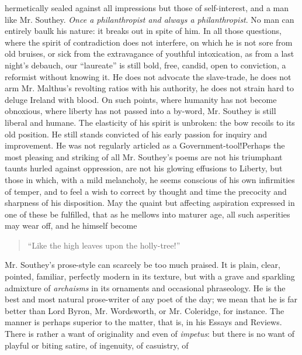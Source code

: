 hermetically sealed against all impressions but those of
self-interest, and a man like Mr. Southey. \emph{Once a
  philanthropist and always a philanthropist}.  No man can
entirely baulk his nature: it breaks out in spite of him.  In all
those questions, where the spirit of contradiction does not
interfere, on which he is not sore from old bruises, or sick from
the extravagance of youthful intoxication, as from a last night's
debauch, our ``laureate'' is still bold, free, candid, open to
conviction, a reformist without knowing it. He does not advocate
the slave-trade, he does not arm Mr. Malthus's revolting ratios
with his authority, he does not strain hard to deluge Ireland with
blood. On such points, where humanity has not become obnoxious,
where liberty has not passed into a by-word, Mr. Southey is still
liberal and humane. The elasticity of his spirit is unbroken: the
bow recoils to its old position. He still stands convicted of his
early passion for inquiry and improvement. He was not regularly
articled as a Government-tool!\textemdash Perhaps the most
pleasing and striking of all Mr. Southey's poems are not his
triumphant taunts hurled against oppression, are not his glowing
effusions to Liberty, but those in which, with a mild melancholy,
he seems conscious of his own infirmities of temper, and to feel a
wish to correct by thought and time the precocity and sharpness of
his disposition. May the quaint but affecting aspiration expressed
in one of these be fulfilled, that as he mellows into maturer age,
all such asperities may wear off, and he himself become
\begin{quote}
  ``Like the high leaves upon the holly-tree!''
\end{quote}
Mr. Southey's prose-style can scarcely be too much praised. It is
plain, clear, pointed, familiar, perfectly modern in its texture,
but with a grave and sparkling admixture of \emph{archaisms} in
its ornaments and occasional phraseology. He is the best and most
natural prose-writer of any poet of the day; we mean that he is
far better than Lord Byron, Mr. Wordsworth, or Mr. Coleridge, for
instance. The manner is perhaps superior to the matter, that is,
in his Essays and Reviews. There is rather a want of originality
and even of \emph{impetus}: but there is no want of playful or
biting satire, of ingenuity, of casuistry, of

